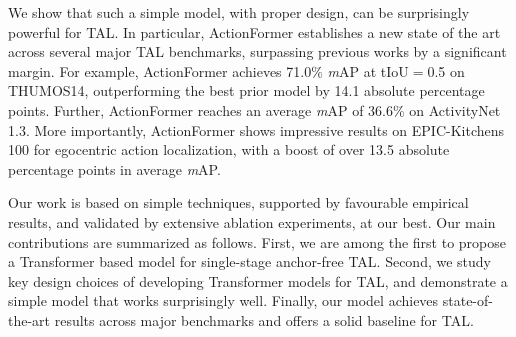We show that such a simple model, with proper design, can be surprisingly powerful for TAL. In particular, ActionFormer establishes a new state of the art across several major TAL benchmarks, surpassing previous works by a significant margin. For example, ActionFormer achieves 71.0\% \textit{m}AP at tIoU$=$0.5 on THUMOS14, outperforming the best prior model by 14.1 absolute percentage points. Further, ActionFormer reaches an average \textit{m}AP of 36.6\% on ActivityNet 1.3. More importantly, ActionFormer shows impressive results on EPIC-Kitchens 100 for egocentric action localization, with a boost of over 13.5 absolute percentage points in average \textit{m}AP. %

Our work is based on simple techniques, supported by favourable empirical results, and validated by extensive ablation experiments, at our best. Our main contributions are summarized as follows. First, we are among the first to propose a Transformer based model for single-stage anchor-free TAL. Second, we study key design choices of developing Transformer models for TAL, and demonstrate a simple model that works surprisingly well. Finally, our model achieves state-of-the-art results across major benchmarks and offers a solid baseline for TAL. 

